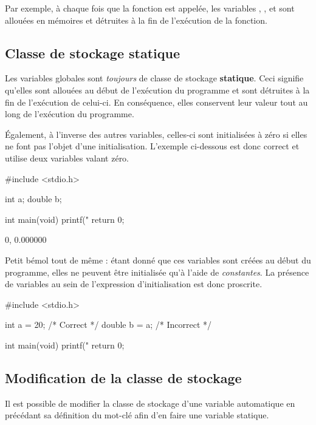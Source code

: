 Par exemple, à chaque fois que la fonction  est appelée,
les variables , ,  et  sont
allouées en mémoires et détruites à la fin de l'exécution de la
fonction.

\subsection{Classe de stockage statique}
\label{classe-de-stockage-statique}

Les variables globales sont \emph{toujours} de classe de stockage
\textbf{statique}. Ceci signifie qu'elles sont allouées au début de
l'exécution du programme et sont détruites à la fin de l'exécution de
celui-ci. En conséquence, elles conservent leur valeur tout au long de
l'exécution du programme.

Également, à l'inverse des autres variables, celles-ci sont initialisées
à zéro si elles ne font pas l'objet d'une initialisation. L'exemple
ci-dessous est donc correct et utilise deux variables valant zéro.

\begin{C}
#include <stdio.h>

int a;
double b;


int main(void)
{
    printf("%
    return 0;
}
\end{C}

\begin{C}
0, 0.000000
\end{C}

Petit bémol tout de même : étant donné que ces variables sont créées au
début du programme, elles ne peuvent être initialisée qu'à l'aide de
\emph{constantes}. La présence de variables au sein de l'expression
d'initialisation est donc proscrite.

\begin{C}
#include <stdio.h>

int a = 20; /* Correct */
double b = a; /* Incorrect */


int main(void)
{
    printf("%
    return 0;
}
\end{C}

\subsection{Modification de la classe de stockage}
\label{modification-de-la-classe-de-stockage}

Il est possible de modifier la classe de stockage d'une variable
automatique en précédant sa définition du mot-clé  afin
d'en faire une variable statique.

